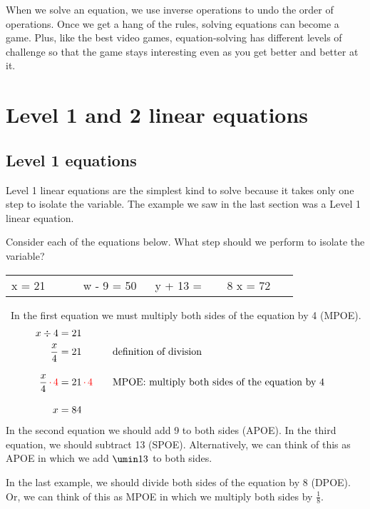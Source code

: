 When we solve an equation, we use inverse operations to undo the order of operations. Once we get a hang of the rules, solving equations can become a game. Plus, like the best video games, equation-solving has different levels of challenge so that the game stays interesting even as you get better and better at it.


\section{Level 1 and 2 linear equations}
\label{sec:linearlevels1and2}

\subsection{Level 1 equations}

Level 1 linear equations are the simplest kind to solve because it takes only one step to isolate the variable. The example we saw in the last section was a Level 1 linear equation.

\begin{boxedex}
Consider each of the equations below. What step should we perform to isolate the variable?

\begin{tabular}{C{0.2\linewidth}C{0.2\linewidth}C{0.2\linewidth}C{0.2\linewidth}}
x = 21 & w - 9 = 50 & y + 13 =  & 8 x = 72\\
\end{tabular}

\expsoln\ In the first equation we must multiply both sides of the equation by 4 (MPOE).
\[\begin{aligned}
x \div 4& = 21\\
\frac{x}{4}& = 21
&&\text{\quad definition of division}\\[2ex]
\frac{x}{4} {\color{red} \,\cdot\,4} & = 21 {\color{red} \,\cdot\,4}
&&\text{\quad MPOE: multiply both sides of the equation by 4}\\[2ex]
x & = 84
\end{aligned}\]
In the second equation we should add 9 to both sides (APOE). In the third equation, we should subtract 13 (SPOE). Alternatively, we can think of this as APOE in which we add $\umin13$ to both sides.

In the last example, we should divide both sides of the equation by 8 (DPOE). Or, we can think of this as MPOE in which we multiply both sides by $\frac{1}{8}$.
\end{boxedex}

